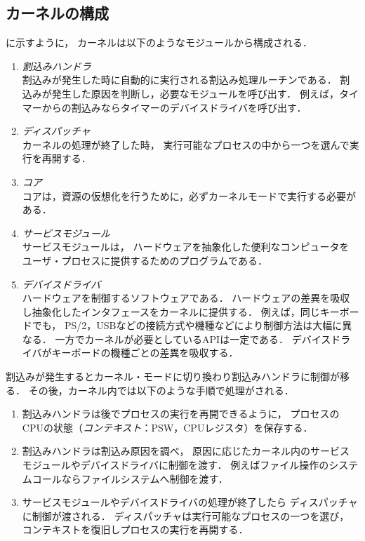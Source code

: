 \subsection{カーネルの構成}
に示すように，
カーネルは以下のようなモジュールから構成される．

\begin{enumerate}
\item \emph{割込みハンドラ} \\
  割込みが発生した時に自動的に実行される割込み処理ルーチンである．
  割込みが発生した原因を判断し，必要なモジュールを呼び出す．
  例えば，タイマーからの割込みならタイマーのデバイスドライバを呼び出す．
\item \emph{ディスパッチャ} \\
  カーネルの処理が終了した時，
  実行可能なプロセスの中から一つを選んで実行を再開する．
\item \emph{コア} \\
  コアは，資源の仮想化を行うために，必ずカーネルモードで実行する必要がある．
\item \emph{サービスモジュール} \\
  サービスモジュールは，
  ハードウェアを抽象化した便利なコンピュータを
  ユーザ・プロセスに提供するためのプログラムである．
\item \emph{デバイスドライバ} \\
  ハードウェアを制御するソフトウェアである．
  ハードウェアの差異を吸収し抽象化したインタフェースをカーネルに提供する．
  例えば，同じキーボードでも，
  PS/2，USBなどの接続方式や機種などにより制御方法は大幅に異なる．
  一方でカーネルが必要としているAPIは一定である．
  デバイスドライバがキーボードの機種ごとの差異を吸収する．
\end{enumerate}

割込みが発生するとカーネル・モードに切り換わり割込みハンドラに制御が移る．
その後，カーネル内では以下のような手順で処理がされる．

\begin{enumerate}
\item 割込みハンドラは後でプロセスの実行を再開できるように，
  プロセスのCPUの状態（\emph{コンテキスト}：PSW，CPUレジスタ）を保存する．
\item 割込みハンドラは割込み原因を調べ，
  原因に応じたカーネル内のサービスモジュールやデバイスドライバに制御を渡す．
  例えばファイル操作のシステムコールならファイルシステムへ制御を渡す．
\item サービスモジュールやデバイスドライバの処理が終了したら
  ディスパッチャに制御が渡される．
  ディスパッチャは実行可能なプロセスの一つを選び，
  コンテキストを復旧しプロセスの実行を再開する．
\end{enumerate}

